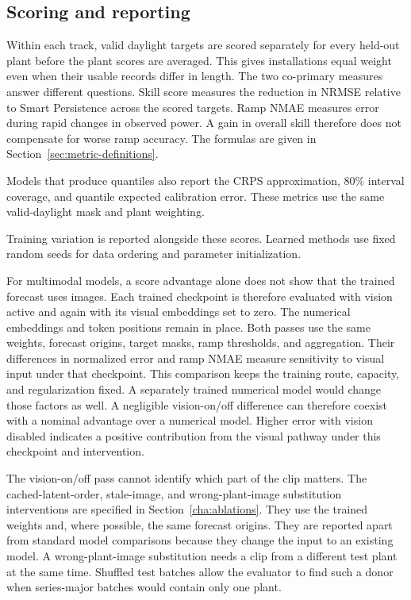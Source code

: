 \subsection{Scoring and reporting}

Within each track, valid daylight targets are scored separately for every held-out plant before the plant scores are averaged. This gives installations equal weight even when their usable records differ in length. The two co-primary measures answer different questions. Skill score measures the reduction in NRMSE relative to Smart Persistence across the scored targets. Ramp NMAE measures error during rapid changes in observed power. A gain in overall skill therefore does not compensate for worse ramp accuracy. The formulas are given in Section~\ref{sec:metric-definitions}.

Models that produce quantiles also report the CRPS approximation, 80\% interval coverage, and quantile expected calibration error. These metrics use the same valid-daylight mask and plant weighting.

Training variation is reported alongside these scores. Learned methods use fixed random seeds for data ordering and parameter initialization.

For multimodal models, a score advantage alone does not show that the trained forecast uses images. Each trained checkpoint is therefore evaluated with vision active and again with its visual embeddings set to zero. The numerical embeddings and token positions remain in place. Both passes use the same weights, forecast origins, target masks, ramp thresholds, and aggregation. Their differences in normalized error and ramp NMAE measure sensitivity to visual input under that checkpoint. This comparison keeps the training route, capacity, and regularization fixed. A separately trained numerical model would change those factors as well. A negligible vision-on/off difference can therefore coexist with a nominal advantage over a numerical model. Higher error with vision disabled indicates a positive contribution from the visual pathway under this checkpoint and intervention.

The vision-on/off pass cannot identify which part of the clip matters. The cached-latent-order, stale-image, and wrong-plant-image substitution interventions are specified in Section~\ref{cha:ablations}. They use the trained weights and, where possible, the same forecast origins. They are reported apart from standard model comparisons because they change the input to an existing model. A wrong-plant-image substitution needs a clip from a different test plant at the same time. Shuffled test batches allow the evaluator to find such a donor when series-major batches would contain only one plant.


